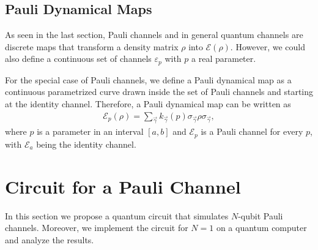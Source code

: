 \documentclass[10pt,letterpaper]{article} %
\begin{document}
\subsection{Pauli Dynamical Maps} %
\label{subsec: Pauli Dynamical Maps}


As seen in the last section, Pauli channels and in 
general quantum channels are discrete maps
that transform a density matrix $\rho$ into $\mathcal{E}(\rho)$.
However, we could also define a continuous set of 
channels $\varepsilon_p$ with $p$ a real parameter.

For the special case of Pauli channels, we define 
a Pauli dynamical map as a continuous parametrized 
curve drawn inside the set of Pauli channels and starting at the identity channel. 
Therefore, a Pauli dynamical map can be written as
\begin{eqnarray}
\label{eq: Pauli dynamical map}
\mathcal{E}_p(\rho) = \sum_{\vec{\gamma}} k_{\vec{\gamma}}(p) \sigma_{\vec{\gamma}} \rho \sigma_{\vec{\gamma}},
\end{eqnarray}
where $p$ is a parameter in an interval $[a,b]$ 
and $\mathcal{E}_p$ is a Pauli channel for every $p$, 
with $\mathcal{E}_a$ being the identity channel.

\section{Circuit for a Pauli Channel} %
\label{subsec: Circuit for a Pauli Channel}


In this section we propose a quantum circuit that simulates $N$-qubit Pauli
channels.  Moreover, we implement the circuit for $N=1$ on a quantum computer
and analyze the results.
\end{document}
